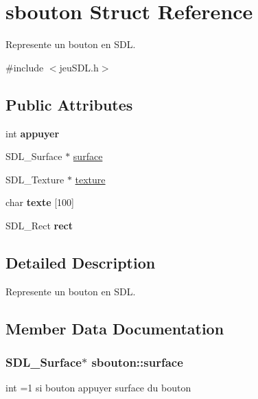 \hypertarget{structsbouton}{}\section{sbouton Struct Reference}
\label{structsbouton}


Represente un bouton en S\+DL.  




{\ttfamily \#include $<$jeu\+S\+D\+L.\+h$>$}

\subsection*{Public Attributes}
\begin{DoxyCompactItemize}
\item 
int {\bfseries appuyer}\hypertarget{structsbouton_a582b3ebfc93494875f1e755df5370659}{}\label{structsbouton_a582b3ebfc93494875f1e755df5370659}

\item 
S\+D\+L\+\_\+\+Surface $\ast$ \hyperlink{structsbouton_a7e4e20bb9c873b793b6113992ee0feab}{surface}
\item 
S\+D\+L\+\_\+\+Texture $\ast$ \hyperlink{structsbouton_a3d5b47fd9c8a5c6adab155a76d6a50d3}{texture}
\item 
char {\bfseries texte} \mbox{[}100\mbox{]}\hypertarget{structsbouton_a13e5834b30ae88ccbc7652411e798e32}{}\label{structsbouton_a13e5834b30ae88ccbc7652411e798e32}

\item 
S\+D\+L\+\_\+\+Rect {\bfseries rect}\hypertarget{structsbouton_afa76f08c8519504fa83f9cc149d623d2}{}\label{structsbouton_afa76f08c8519504fa83f9cc149d623d2}

\end{DoxyCompactItemize}


\subsection{Detailed Description}
Represente un bouton en S\+DL. 

\subsection{Member Data Documentation}
\subsubsection[{\texorpdfstring{surface}{surface}}]{\setlength{\rightskip}{0pt plus 5cm}S\+D\+L\+\_\+\+Surface$\ast$ sbouton\+::surface}\hypertarget{structsbouton_a7e4e20bb9c873b793b6113992ee0feab}{}\label{structsbouton_a7e4e20bb9c873b793b6113992ee0feab}
int =1 si bouton appuyer surface du bouton 
